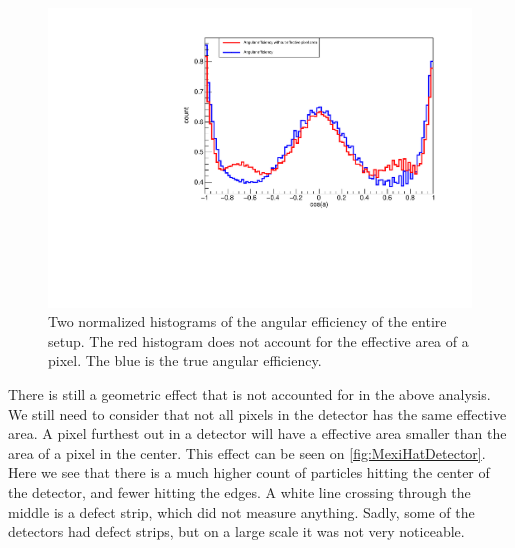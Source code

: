 \begin{figure}[h]
	\includegraphics[width=\linewidth]{../figures/allDetEff.pdf}
	\caption{Two normalized histograms of the angular efficiency of the entire setup. The red histogram does not account for the effective area of a pixel. The blue is the true angular efficiency.}
	\label{fig:effAllDet}
\end{figure}
There is still a geometric effect that is not accounted for in the above analysis. We still need to consider that not all pixels in the detector has the same effective area. 
A pixel furthest out in a detector will have a effective area smaller than the area of a pixel in the center. This effect can be seen on \cref{fig:MexiHatDetector}. Here we see that there is a much higher count of particles hitting the center of the detector, and fewer hitting the edges. A white line crossing through the middle is a defect strip, which did not measure anything. Sadly, some of the detectors had defect strips, but on a large scale it was not very noticeable.
